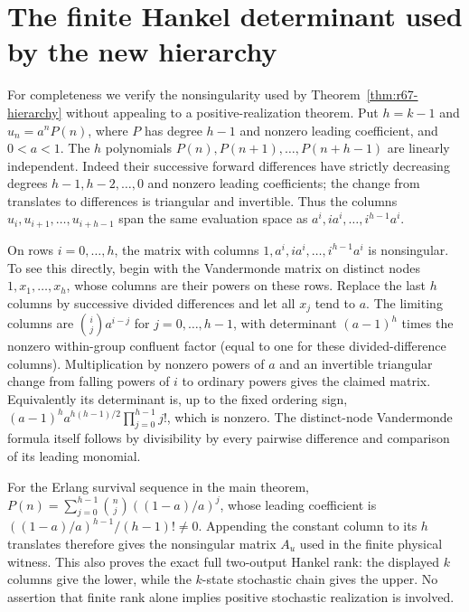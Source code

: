 \section{The finite Hankel determinant used by the new hierarchy}\label{sec:r67-determinant}
For completeness we verify the nonsingularity used by Theorem~\ref{thm:r67-hierarchy} without appealing to a positive-realization theorem. Put $h=k-1$ and $u_n=a^nP(n)$, where $P$ has degree $h-1$ and nonzero leading coefficient, and $0<a<1$. The $h$ polynomials $P(n),P(n+1),\ldots,P(n+h-1)$ are linearly independent. Indeed their successive forward differences have strictly decreasing degrees $h-1,h-2,\ldots,0$ and nonzero leading coefficients; the change from translates to differences is triangular and invertible. Thus the columns $u_i,u_{i+1},\ldots,u_{i+h-1}$ span the same evaluation space as $a^i,i a^i,\ldots,i^{h-1}a^i$.

On rows $i=0,\ldots,h$, the matrix with columns $1,a^i,i a^i,\ldots,i^{h-1}a^i$ is nonsingular. To see this directly, begin with the Vandermonde matrix on distinct nodes $1,x_1,\ldots,x_h$, whose columns are their powers on these rows. Replace the last $h$ columns by successive divided differences and let all $x_j$ tend to $a$. The limiting columns are $\binom{i}{j}a^{i-j}$ for $j=0,\ldots,h-1$, with determinant $(a-1)^h$ times the nonzero within-group confluent factor (equal to one for these divided-difference columns). Multiplication by nonzero powers of $a$ and an invertible triangular change from falling powers of $i$ to ordinary powers gives the claimed matrix. Equivalently its determinant is, up to the fixed ordering sign, $(a-1)^h a^{h(h-1)/2}\prod_{j=0}^{h-1}j!$, which is nonzero. The distinct-node Vandermonde formula itself follows by divisibility by every pairwise difference and comparison of its leading monomial.

For the Erlang survival sequence in the main theorem,
$P(n)=\sum_{j=0}^{h-1}\binom{n}{j}((1-a)/a)^j$,
whose leading coefficient is $((1-a)/a)^{h-1}/(h-1)!\ne0$. Appending the constant column to its $h$ translates therefore gives the nonsingular matrix $A_u$ used in the finite physical witness. This also proves the exact full two-output Hankel rank: the displayed $k$ columns give the lower, while the $k$-state stochastic chain gives the upper. No assertion that finite rank alone implies positive stochastic realization is involved.

